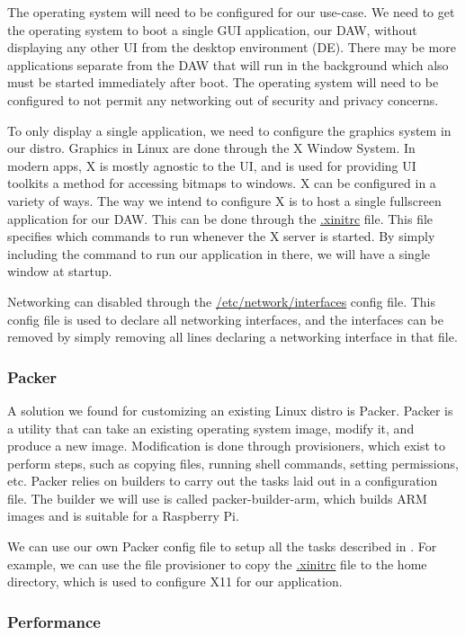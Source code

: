 The operating system will need to be configured for our use-case. We need to get the
operating system to boot a single GUI application, our DAW, without displaying any other
UI from the desktop environment (DE). There may be more applications separate from the DAW
that will run in the background which also must be started immediately after boot. The
operating system will need to be configured to not permit any networking out of security
and privacy concerns.

To only display a single application, we need to configure the graphics system in our
distro. Graphics in Linux are done through the X Window System. In modern apps, X is
mostly agnostic to the UI, and is used for providing UI toolkits a method for accessing
bitmaps to windows. X can be configured in a variety of ways. The way we intend to
configure X is to host a single fullscreen application for our DAW. This can be done
through the \url{.xinitrc} file. This file specifies which commands to run whenever the X
server is started. By simply including the command to run our application in there, we
will have a single window at startup.

Networking can disabled through the \url{/etc/network/interfaces} config file. This config
file is used to declare all networking interfaces, and the interfaces can be removed by
simply removing all lines declaring a networking interface in that file.

\subsubsection{Packer}

A solution we found for customizing an existing Linux distro is Packer. Packer is a
utility that can take an existing operating system image, modify it, and produce a new
image. Modification is done through provisioners, which exist to perform steps, such as
copying files, running shell commands, setting permissions, etc. Packer relies on builders
to carry out the tasks laid out in a configuration file. The builder we will use is called
packer-builder-arm, which builds ARM images and is suitable for a Raspberry Pi.

We can use our own Packer config file to setup all the tasks described in
. For example, we can use the file provisioner to
copy the \url{.xinitrc} file to the home directory, which is used to configure X11 for our
application.

\subsubsection{Performance}

